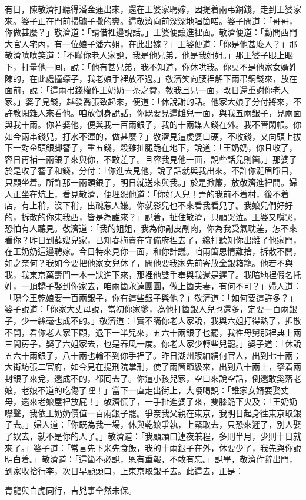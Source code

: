 有日，陳敬濟打聽得潘金蓮出來，還在王婆家聘嫁，因提着兩弔銅錢，走到王婆家來。婆子正在門前掃驢子撒的糞。這敬濟向前深深地唱箇喏。婆子問道：「哥哥，你做甚麼？」敬濟道：「請借裡邊說話。」王婆便讓進裡面。敬濟便道：「動問西門大官人宅內，有一位娘子潘六姐，在此出嫁？」王婆便道：「你是他甚麼人？」那敬濟嘻嘻笑道：「不瞞你老人家說，我是他兄弟，他是我姐姐。」那王婆子眼上眼下，打量他一囘，說：「他有甚兄弟，我不知道，你休哄我。你莫不是他家女婿姓陳的，在此處撞蠓子，{}我老娘手裡放不過。」敬濟笑向腰裡解下兩弔銅錢來，放在面前，說：「這兩弔錢權作王奶奶一茶之費，教我且見一面，改日還重謝你老人家。」婆子見錢，越發喬張致起來，便道：「休說謝的話。他家大娘子分付將來，不許教閑雜人來看他。咱放倒身說話，你既要見這雌兒一面，與我五兩銀子，見兩面與我十兩。你若娶他，便與我一百兩銀子，我的十兩媒人錢在外。{}我不管閑帳。你如今兩串錢兒，打水不渾的，做甚麼？」敬濟見這虔婆口硬，不收錢，又向頭上拔下一對金頭銀脚簪子，重五錢，殺雞扯腿跪在地下，說道：「王奶奶，你且收了，容日再補一兩銀子來與你，不敢差了。且容我見他一面，說些話兒則箇。」那婆子於是收了簪子和錢，分付：「你進去見他，說了話就與我出來。不許你涎眉睜目，只顧坐着。{}所許那一兩頭銀子，明日就送來與我。」於是掀簾，放敬濟進裡間。婦人正坐在炕上，看見敬濟，便埋怨他道：「你好人兒！弄的我前不着村，後不着店，有上稍，沒下稍，出醜惹人嫌。你就影兒也不來看我看兒了。我娘兒們好好的，拆散的你東我西，皆是為誰來？」說着，扯住敬濟，只顧哭泣。王婆又嗔哭，恐怕有人聽見。敬濟道：「我的姐姐，我為你剮皮剮肉，你為我受氣耽羞，怎不來看你？昨日到薛嫂兒家，已知春梅賣在守備府裡去了，纔打聽知你出離了他家門，在王奶奶這邊聘嫁。今日特來見你一面，和你計議。咱兩箇恩情難捨，拆散不開，如之奈何？我如今要把他家女兒休了，問他要我家先前寄放金銀箱籠。他若不與我，我東京萬壽門一本一狀進下來，那裡他雙手奉與我還是遲了。我暗地裡假名托姓，一頂轎子娶到你家去，咱兩箇永遠團圓，做上箇夫妻，有何不可？」婦人道：「現今王乾娘要一百兩銀子，你有這些銀子與他？」敬濟道：「如何要這許多？」婆子說道：「你家大丈母說，當初你家爹，為他打箇銀人兒也還多，定要一百兩銀子，少一絲毫也成不的。」敬濟道：「實不瞞你老人家說，我與六姐打得熱了，拆散不開，看你老人家下顧，退下一半兒來，五六十兩銀子也罷，我徃母舅那裡典上兩三間房子，娶了六姐家去，也是春風一度。你老人家少轉些兒罷。」婆子道：「休說五六十兩銀子，八十兩也輪不到你手裡了。昨日湖州販紬絹何官人，{}出到七十兩；大街坊張二官府，如今見在提刑院掌刑，使了兩箇節級來，出到八十兩上，拏着兩封銀子來兌，還成不的，都囘去了。你這小孩兒家，空口來說空話，倒還敢奚落老娘，老娘不道的吃傷了哩！」當下一直走出街上，大喓喝說：「誰家女婿要娶丈母，還來老娘屋裡放屁！」{}敬濟慌了，一手扯進婆子來，雙膝跪下央及：「王奶奶噤聲，我依王奶奶價值一百兩銀子罷。爭奈我父親在東京，我明日起身徃東京取銀子去。」婦人道：「你既為我一場，休與乾娘爭執，上緊取去，只恐來遲了，別人娶了奴去，就不是你的人了。」敬濟道：「我顧頭口連夜兼程，多則半月，少則十日就來了。」婆子道：「常言先下米先食飯，我的十兩銀子在外，休要少了，{}我先與你說明白着。」敬濟道：「這箇不必說，恩有重報，不敢有忘。」說畢，敬濟作辭出門，到家收拾行李，次日早顧頭口，上東京取銀子去。此這去，正是：

\begin{myquote}
青龍與白虎同行，吉兇事全然未保。
\end{myquote}

